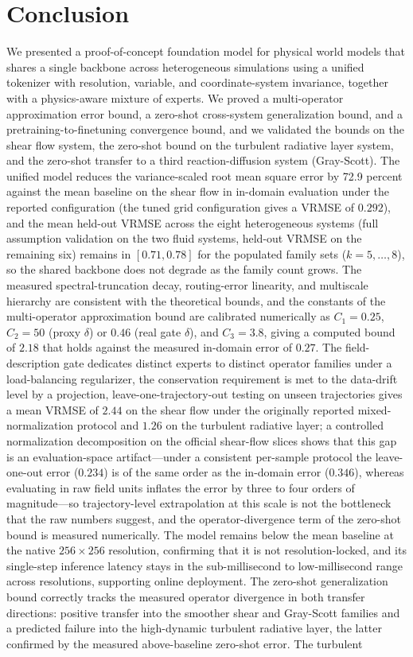 \documentclass[preprint,12pt]{elsarticle}
\begin{document}
\section{Conclusion}
We presented a proof-of-concept foundation model for physical world models that shares a single backbone across heterogeneous simulations using a unified tokenizer with resolution, variable, and coordinate-system invariance, together with a physics-aware mixture of experts. We proved a multi-operator approximation error bound, a zero-shot cross-system generalization bound, and a pretraining-to-finetuning convergence bound, and we validated the bounds on the shear flow system, the zero-shot bound on the turbulent radiative layer system, and the zero-shot transfer to a third reaction-diffusion system (Gray-Scott). The unified model reduces the variance-scaled root mean square error by 72.9 percent against the mean baseline on the shear flow in in-domain evaluation under the reported configuration (the tuned grid configuration gives a VRMSE of $0.292$), and the mean held-out VRMSE across the eight heterogeneous systems (full assumption validation on the two fluid systems, held-out VRMSE on the remaining six) remains in $[0.71,0.78]$ for the populated family sets ($k=5,\dots,8$), so the shared backbone does not degrade as the family count grows. The measured spectral-truncation decay, routing-error linearity, and multiscale hierarchy are consistent with the theoretical bounds, and the constants of the multi-operator approximation bound are calibrated numerically as $C_1=0.25$, $C_2=50$ (proxy $\delta$) or $0.46$ (real gate $\delta$), and $C_3=3.8$, giving a computed bound of $2.18$ that holds against the measured in-domain error of $0.27$. The field-description gate dedicates distinct experts to distinct operator families under a load-balancing regularizer, the conservation requirement is met to the data-drift level by a projection, leave-one-trajectory-out testing on unseen trajectories gives a mean VRMSE of $2.44$ on the shear flow under the originally reported mixed-normalization protocol and $1.26$ on the turbulent radiative layer; a controlled normalization decomposition on the official shear-flow slices shows that this gap is an evaluation-space artifact---under a consistent per-sample protocol the leave-one-out error ($0.234$) is of the same order as the in-domain error ($0.346$), whereas evaluating in raw field units inflates the error by three to four orders of magnitude---so trajectory-level extrapolation at this scale is not the bottleneck that the raw numbers suggest, and the operator-divergence term of the zero-shot bound is measured numerically. The model remains below the mean baseline at the native $256\times256$ resolution, confirming that it is not resolution-locked, and its single-step inference latency stays in the sub-millisecond to low-millisecond range across resolutions, supporting online deployment. The zero-shot generalization bound correctly tracks the measured operator divergence in both transfer directions: positive transfer into the smoother shear and Gray-Scott families and a predicted failure into the high-dynamic turbulent radiative layer, the latter confirmed by the measured above-baseline zero-shot error. The turbulent 
\end{document}
